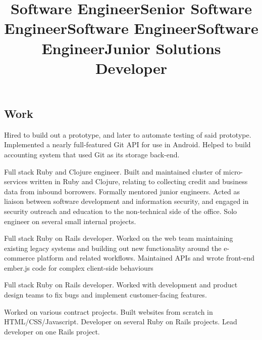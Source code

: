 \documentclass[margin,line,letterpaper]{resume}
\begin{document}
\begin{resume}
  \section{\mysidestyle Work}

  \title{\bf Software Engineer}
  \location{}
  \begin{position}
    Hired to build out a prototype, and later to automate testing of
    said prototype. Implemented a nearly full-featured Git API for use
    in Android. Helped to build accounting system that used Git as
    its storage back-end.
  \end{position}

  \title{\bf Senior Software Engineer}
  \location{}
  \begin{position}
    Full stack Ruby and Clojure engineer. Built and maintained
    cluster of micro-services written in Ruby and Clojure, relating
    to collecting credit and business data from inbound borrowers.
    Formally mentored junior engineers. Acted as liaison between
    software development and information security, and engaged in
    security outreach and education to the non-technical side of
    the office. Solo engineer on several small internal projects.
  \end{position}

  \title{\bf Software Engineer}
  \location{}
  \begin{position}
    Full stack Ruby on Rails developer. Worked on the web team
    maintaining existing legacy systems and building out new
    functionality around the e-commerce platform and related
    workflows. Maintained APIs and wrote front-end ember.js code
    for complex client-side behaviours
  \end{position}

  \title{\bf Software Engineer}
  \location{}
  \begin{position}
    Full stack Ruby on Rails developer. Worked with development and
    product design teams to fix bugs and implement customer-facing
    features.
  \end{position}

  \title{\bf Junior Solutions Developer}
  \location{}
  \begin{position}
    Worked on various contract projects. Built websites from scratch
    in HTML/CSS/Javascript. Developer on several Ruby on Rails
    projects. Lead developer on one Rails project.
  \end{position}

\end{resume}
\end{document}
